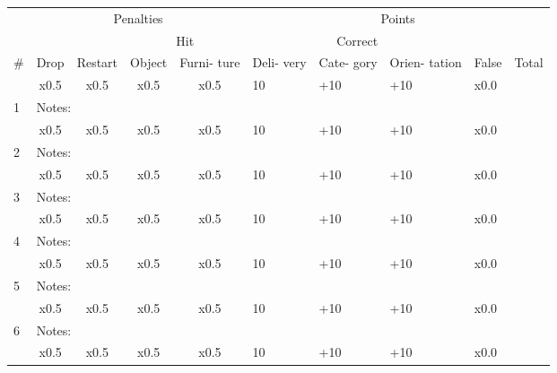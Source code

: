 \documentclass{article}
\begin{document}
\begin{center}
\begin{tabular}{|m{0.4cm}|m{0.8cm}|m{1.2cm}|m{1cm}|m{1cm}|m{0.8cm}|m{0.8cm}|m{1cm}|m{0.8cm}|m{0.8cm}|}
    \hline
    &\multicolumn{4}{|c|}{Penalties }& \multicolumn{5}{|c|}{Points }\\
    \cline{2-10}
    & & &\multicolumn{2}{|c|}{Hit}&\multicolumn{3}{|c|}{Correct}& &\\
    \cline{4-5} \cline{6-8}
    \#& Drop& Restart& Object& Furni- ture& Deli- very& Cate- gory& Orien- tation& False& Total \\
    \hline
     & \multicolumn{1}{|c|}{x0.5} & \multicolumn{1}{|c|}{x0.5} & \multicolumn{1}{|c|}{x0.5} & \multicolumn{1}{|c|}{x0.5}& 10& +10& +10& x0.0&\\
    \cline{2-9}
    1 & \multicolumn{8}{|l|}{Notes: }&\\
    \hline
     & \multicolumn{1}{|c|}{x0.5} & \multicolumn{1}{|c|}{x0.5} & \multicolumn{1}{|c|}{x0.5} & \multicolumn{1}{|c|}{x0.5}& 10& +10& +10& x0.0&\\
    \cline{2-9}
    2 & \multicolumn{8}{|l|}{Notes: }&\\
    \hline
     & \multicolumn{1}{|c|}{x0.5} & \multicolumn{1}{|c|}{x0.5} & \multicolumn{1}{|c|}{x0.5} & \multicolumn{1}{|c|}{x0.5}& 10& +10& +10& x0.0&\\
    \cline{2-9}
    3 & \multicolumn{8}{|l|}{Notes: }&\\
    \hline
     & \multicolumn{1}{|c|}{x0.5} & \multicolumn{1}{|c|}{x0.5} & \multicolumn{1}{|c|}{x0.5} & \multicolumn{1}{|c|}{x0.5}& 10& +10& +10& x0.0&\\
    \cline{2-9}
    4 & \multicolumn{8}{|l|}{Notes: }&\\
    \hline
     & \multicolumn{1}{|c|}{x0.5} & \multicolumn{1}{|c|}{x0.5} & \multicolumn{1}{|c|}{x0.5} & \multicolumn{1}{|c|}{x0.5}& 10& +10& +10& x0.0&\\
    \cline{2-9}
    5 & \multicolumn{8}{|l|}{Notes: }&\\
    \hline
     & \multicolumn{1}{|c|}{x0.5} & \multicolumn{1}{|c|}{x0.5} & \multicolumn{1}{|c|}{x0.5} & \multicolumn{1}{|c|}{x0.5}& 10& +10& +10& x0.0&\\
    \cline{2-9}
    6 & \multicolumn{8}{|l|}{Notes: }&\\
    \hline
     & \multicolumn{1}{|c|}{x0.5} & \multicolumn{1}{|c|}{x0.5} & \multicolumn{1}{|c|}{x0.5} & \multicolumn{1}{|c|}{x0.5}& 10& +10& +10& x0.0&\\

\end{tabular}
\end{center}
\end{document}
